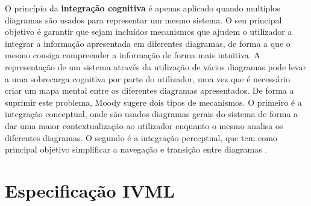 O princípio da \textbf{integração cognitiva} é apenas aplicado quando multiplos diagramas são usados para representar um mesmo sistema. O seu principal objetivo é garantir que sejam incluídos mecanismos que ajudem o utilizador a integrar a informação apresentada em diferentes diagramas, de forma a que o mesmo consiga compreender a informação de forma mais intuitiva. A representação de um sistema através da utilização de vários diagramas pode levar a uma sobrecarga cognitiva por parte do utilizador, uma vez que é necessário criar um mapa mental entre os diferentes diagramas apresentados. De forma a suprimir este problema, Moody sugere dois tipos de mecanismos. O primeiro é a integração conceptual, onde são usados diagramas gerais do sistema de forma a dar uma maior contextualização ao utilizador enquanto o mesmo analisa os diferentes diagramas. O segundo é a integração perceptual, que tem como principal objetivo simplificar a navegação e transição entre diagramas \cite{moody2009physics}.



\section{Especificação IVML}
\label{sec:esp_ivml}


